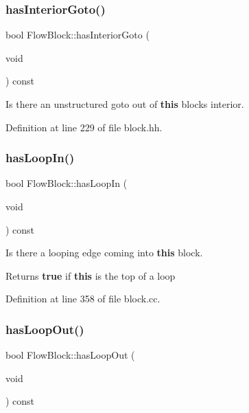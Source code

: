 \subsubsection{\texorpdfstring{hasInteriorGoto()}{hasInteriorGoto()}}
{\footnotesize\ttfamily bool Flow\+Block\+::has\+Interior\+Goto (\begin{DoxyParamCaption}\item[{void}]{ }\end{DoxyParamCaption}) const\hspace{0.3cm}{\ttfamily [inline]}}



Is there an unstructured goto out of {\bfseries{this}} block\textquotesingle{}s interior. 



Definition at line 229 of file block.\+hh.

\mbox{\label{class_flow_block_a54d8e26d57d72d73f4ae36744eccf85d}} 
\subsubsection{\texorpdfstring{hasLoopIn()}{hasLoopIn()}}
{\footnotesize\ttfamily bool Flow\+Block\+::has\+Loop\+In (\begin{DoxyParamCaption}\item[{void}]{ }\end{DoxyParamCaption}) const}



Is there a looping edge coming into {\bfseries{this}} block. 

\begin{DoxyReturn}{Returns}
{\bfseries{true}} if {\bfseries{this}} is the top of a loop 
\end{DoxyReturn}


Definition at line 358 of file block.\+cc.

\mbox{\label{class_flow_block_af871bdc2674a0bcc53c9886e57e70f72}} 
\subsubsection{\texorpdfstring{hasLoopOut()}{hasLoopOut()}}
{\footnotesize\ttfamily bool Flow\+Block\+::has\+Loop\+Out (\begin{DoxyParamCaption}\item[{void}]{ }\end{DoxyParamCaption}) const}



